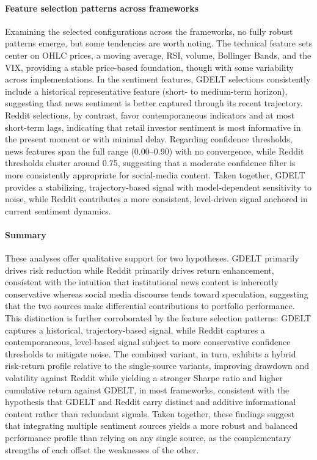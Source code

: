 \paragraph{Feature selection patterns across frameworks} Examining the selected configurations across the frameworks, no fully robust patterns emerge, but some tendencies are worth noting. The technical feature sets center on OHLC prices, a moving average, RSI, volume, Bollinger Bands, and the VIX, providing a stable price-based foundation, though with some variability across implementations. In the sentiment features, GDELT selections consistently include a historical representative feature (short- to medium-term horizon), suggesting that news sentiment is better captured through its recent trajectory. Reddit selections, by contrast, favor contemporaneous indicators and at most short-term lags, indicating that retail investor sentiment is most informative in the present moment or with minimal delay. Regarding confidence thresholds, news features span the full range (0.00--0.90) with no convergence, while Reddit thresholds cluster around 0.75, suggesting that a moderate confidence filter is more consistently appropriate for social-media content. Taken together, GDELT provides a stabilizing, trajectory-based signal with model-dependent sensitivity to noise, while Reddit contributes a more consistent, level-driven signal anchored in current sentiment dynamics.

\paragraph{Summary} These analyses offer qualitative support for two hypotheses. GDELT primarily drives risk reduction while Reddit primarily drives return enhancement, consistent with the intuition that institutional news content is inherently conservative whereas social media discourse tends toward speculation, suggesting that the two sources make differential contributions to portfolio performance. This distinction is further corroborated by the feature selection patterns: GDELT captures a historical, trajectory-based signal, while Reddit captures a contemporaneous, level-based signal subject to more conservative confidence thresholds to mitigate noise. The combined variant, in turn, exhibits a hybrid risk-return profile relative to the single-source variants, improving drawdown and volatility against Reddit while yielding a stronger Sharpe ratio and higher cumulative return against GDELT, in most frameworks, consistent with the hypothesis that GDELT and Reddit carry distinct and additive informational content rather than redundant signals. Taken together, these findings suggest that integrating multiple sentiment sources yields a more robust and balanced performance profile than relying on any single source, as the complementary strengths of each offset the weaknesses of the other.


